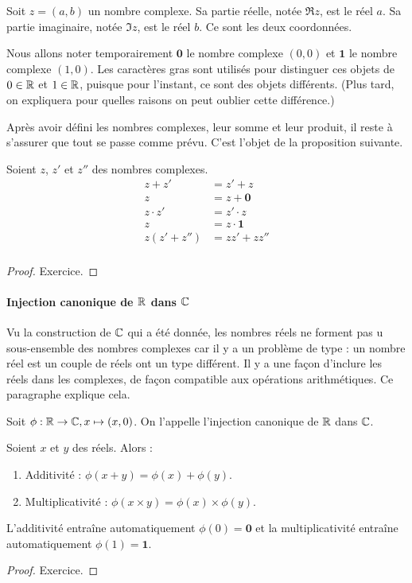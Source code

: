 \begin{definition}
Soit $z=(a,b)$ un nombre complexe. Sa partie réelle, notée $\Re z$, est le réel $a$. Sa partie imaginaire, notée $\Im z$, est le réel $b$. Ce sont les deux coordonnées.
\end{definition}

Nous allons noter temporairement $\mathbf{0}$ le nombre complexe $(0,0)$ et $\mathbf{1}$ le nombre complexe $(1,0)$. Les caractères gras sont utilisés pour distinguer ces objets de $0\in\mathbb{R}$ et $1\in \mathbb{R}$, puisque pour l'instant, ce sont des objets différents. (Plus tard, on expliquera pour quelles raisons on peut oublier cette différence.)

Après avoir défini les nombres complexes, leur somme et leur produit, il reste à s'assurer que tout se passe comme prévu. C'est l'objet de la proposition suivante.

\begin{proposition}
Soient $z$, $z'$ et $z''$ des nombres complexes.
\begin{align*}
z+z' &= z'+z\\
z &= z+\mathbf{0}\\
z\cdot z'&=z'\cdot z\\
z &= z\cdot \mathbf{1}\\
z(z'+z'') &= zz'+zz''\\
\end{align*}
\end{proposition}

\begin{proof}
Exercice.
\end{proof}




\paragraph{Injection canonique de $\mathbb{R}$ dans $\mathbb{C}$}

Vu la construction de $\mathbb{C}$ qui a été donnée, les nombres réels ne forment pas u sous-ensemble des nombres complexes car il y a un problème de type : un nombre réel est un couple de réels ont un type différent. Il y a une façon \og d'inclure \fg{} les réels dans les complexes, de façon compatible aux opérations arithmétiques. Ce paragraphe explique cela.

Soit $\phi : \mathbb{R}\to \mathbb{C}, x\mapsto (x,0)$. On l'appelle l'injection canonique de $\mathbb{R}$ dans $\mathbb{C}$.

\begin{proposition}
Soient $x$ et $y$ des réels. Alors :
\begin{enumerate}
\item Additivité : $\phi(x+y)=\phi(x)+\phi(y)$.
\item Multiplicativité : $\phi(x\times y) = \phi(x)\times \phi(y)$.
\end{enumerate}
\end{proposition}
\begin{exo}
L'additivité entraîne automatiquement $\phi(0)=\mathbf 0$ et la multiplicativité entraîne automatiquement $\phi(1)=\mathbf 1$.
\end{exo}
\begin{proof}
Exercice.
\end{proof}


